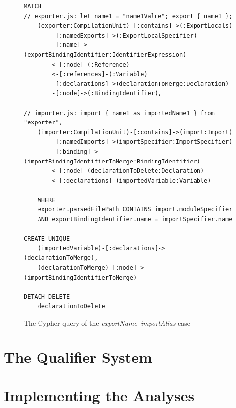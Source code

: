 \begin{figure}[!p]
	\begin{lstlisting}[language=Cypher]
MATCH
// exporter.js: let name1 = "name1Value"; export { name1 };
    (exporter:CompilationUnit)-[:contains]->(:ExportLocals)
        -[:namedExports]->(:ExportLocalSpecifier)
        -[:name]->(exportBindingIdentifier:IdentifierExpression)
        <-[:node]-(:Reference)
        <-[:references]-(:Variable)
        -[:declarations]->(declarationToMerge:Declaration)
        -[:node]->(:BindingIdentifier),

// importer.js: import { name1 as importedName1 } from "exporter";
    (importer:CompilationUnit)-[:contains]->(import:Import)
        -[:namedImports]->(importSpecifier:ImportSpecifier)
        -[:binding]->(importBindingIdentifierToMerge:BindingIdentifier)
        <-[:node]-(declarationToDelete:Declaration)
        <-[:declarations]-(importedVariable:Variable)

    WHERE
    exporter.parsedFilePath CONTAINS import.moduleSpecifier
    AND exportBindingIdentifier.name = importSpecifier.name

CREATE UNIQUE
    (importedVariable)-[:declarations]->(declarationToMerge),
    (declarationToMerge)-[:node]->(importBindingIdentifierToMerge)

DETACH DELETE
    declarationToDelete
	\end{lstlisting}
  \caption{The Cypher query of the \emph{exportName–importAlias} case}
  \label{fig:export-import-example-cypher-source}
\end{figure}


\section{The Qualifier System}


\section{Implementing the Analyses}